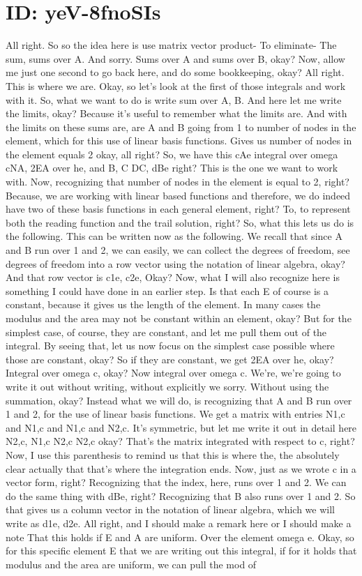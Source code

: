 \documentclass[10pt]{article}
\begin{document}
\section*{ID: yeV-8fnoSIs}
All right. So so the idea here is use matrix vector product- To eliminate- The sum, sums over A. And sorry. Sums over A and sums over B, okay? Now, allow me just one second to go back here, and do some bookkeeping, okay? All right. This is where we are. Okay, so let's look at the first of those integrals and work with it. So, what we want to do is write sum over A, B. And here let me write the limits, okay? Because it's useful to remember what the limits are. And with the limits on these sums are, are A and B going from 1 to number of nodes in the element, which for this use of linear basis functions. Gives us number of nodes in the element equals 2 okay, all right? So, we have this cAe integral over omega cNA, 2EA over he, and B, C DC, dBe right? This is the one we want to work with. Now, recognizing that number of nodes in the element is equal to 2, right? Because, we are working with linear based functions and therefore, we do indeed have two of these basis functions in each general element, right? To, to represent both the reading function and the trail solution, right? So, what this lets us do is the following. This can be written now as the following. We recall that since A and B run over 1 and 2, we can easily, we can collect the degrees of freedom, see degrees of freedom into a row vector using the notation of linear algebra, okay? And that row vector is c1e, c2e, Okay? Now, what I will also recognize here is something I could have done in an earlier step. Is that each E of course is a constant, because it gives us the length of the element. In many cases the modulus and the area may not be constant within an element, okay? But for the simplest case, of course, they are constant, and let me pull them out of the integral. By seeing that, let us now focus on the simplest case possible where those are constant, okay? So if they are constant, we get 2EA over he, okay? Integral over omega c, okay? Now integral over omega c. We're, we're going to write it out without writing, without explicitly we sorry. Without using the summation, okay? Instead what we will do, is recognizing that A and B run over 1 and 2, for the use of linear basis functions. We get a matrix with entries N1,c and N1,c and N1,c and N2,c. It's symmetric, but let me write it out in detail here N2,c, N1,c N2,c N2,c okay? That's the matrix integrated with respect to c, right? Now, I use this parenthesis to remind us that this is where the, the absolutely clear actually that that's where the integration ends. Now, just as we wrote c in a vector form, right? Recognizing that the index, here, runs over 1 and 2. We can do the same thing with dBe, right? Recognizing that B also runs over 1 and 2. So that gives us a column vector in the notation of linear algebra, which we will write as d1e, d2e. All right, and I should make a remark here or I should make a note That this holds if E and A are uniform. Over the element omega e. Okay, so for this specific element E that we are writing out this integral, if for it holds that modulus and the area are uniform, we can pull the mod of 
\end{document}
